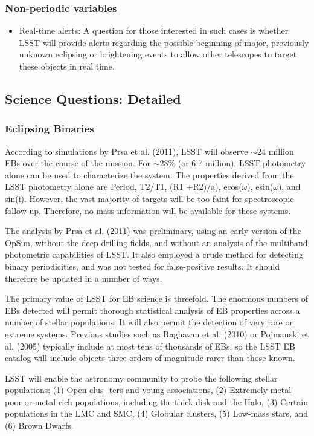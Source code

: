 \subsubsection{Non-periodic variables }
\begin{itemize}
\item{ Real-time alerts: A question for those interested in such cases is whether LSST will provide alerts regarding the possible beginning of major, previously unknown eclipsing or brightening events to allow other telescopes to target these objects in real time. }
\end{itemize}

\subsection{Science Questions: Detailed}
\subsubsection{Eclipsing Binaries }

According to simulations by Prsa et al. (2011), LSST will observe $\sim$24 million EBs over the course of the mission. For $\sim$28\% (or 6.7 million), LSST photometry alone can be used to characterize the system. The properties derived from the LSST photometry alone are Period, T2/T1, (R1 +R2)/a), ecos($\omega$), esin($\omega$), and sin(i). However, the vast majority of targets will be too faint for spectroscopic follow up. Therefore, no mass information will be available for these systems. 

The analysis by Prsa et al. (2011) was preliminary, using an early version of the OpSim, without the deep drilling fields, and without an analysis of the multiband photometric capabilities of LSST. It also employed a crude method for detecting binary periodicities, and was not tested for false-positive results. It should therefore be updated in a number of ways. 

The primary value of LSST for EB science is threefold. The enormous numbers of EBs detected will permit thorough statistical analysis of EB properties across a number of stellar populations. It will also permit the detection of very rare or extreme systems. Previous studies such as Raghavan et al. (2010) or Pojmanski et al. (2005) typically include at most tens of thousands of EBs, so the LSST EB catalog will include objects three orders of magnitude rarer than those known. 

LSST will enable the astronomy community to probe the following stellar populations: (1) Open clus- ters and young associations, (2) Extremely metal-poor or metal-rich populations, including the thick disk 
and the Halo, (3) Certain populations in the LMC and SMC, (4) Globular clusters, (5) Low-mass stars, and (6) Brown Dwarfs. 

